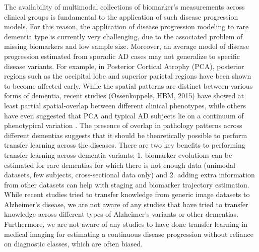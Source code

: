 \documentclass{llncs}
\begin{document}
The availability of multimodal collections of biomarker's measurements across clinical groups is fundamental to the application of such disease progression models. For this reason, the application of disease progression modeling to rare dementia type is currently very challenging, due to the associated problem of missing biomarkers and low sample size.  Moreover, an average model of disease progression estimated from sporadic AD cases may not generalize to specific disease variants. For example, in Posterior Cortical Atrophy (PCA), posterior regions such as the occipital lobe and superior parietal regions have been shown to become affected early. While the spatial patterns are distinct between various forms of dementia, recent studies (Ossenkoppele, HBM, 2015) have showed at least partial spatial-overlap between different clinical phenotypes, while others have even suggested that PCA and typical AD subjects lie on a continuum of phenotypical variation \cite{crutch2012posterior}. The presence of overlap in pathology patterns across different dementias suggests that it should be theoretically possible to perform transfer learning across the diseases. There are two key benefits to performing transfer learning across dementia variants: 1. biomarker evolutions can be estimated for rare dementias for which there is not enough data (unimodal datasets, few subjects, cross-sectional data only) and 2. adding extra information from other datasets can help with staging and biomarker trajectory estimation. While recent studies \cite{hon2017towards} tried to transfer knowledge from generic image datasets to Alzheimer's disease, we are not aware of any studies that have tried to transfer knowledge across different types of Alzheimer's variants or other dementias. Furthermore, we are not aware of any studies to have done transfer learning in medical imaging for estimating a continuous disease progression without reliance on diagnostic classes, which are often biased.

\end{document}
